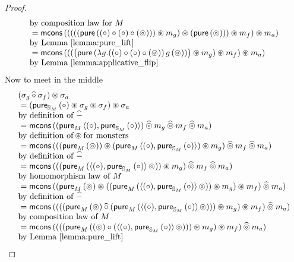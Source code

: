 \begin{lemma}
\begin{proof}
$$\begin{array}{ll}
 \mbox{by composition law for }M \\
{}= \mcons\,( (  ( (  (\apure\, ((\comp) \comp (\comp) \comp (\pappl))) \appl m_g  ) \appl (\apure\, (\pappl)) ) \appl m_f  ) \appl m_a)\\
 \mbox{by Lemma \ref{lemma:pure_lift}}\\
{}= \mcons\,( (  (  \big(\apure\, (\lambda g . ((\comp) \comp (\comp) \comp (\pappl))\, g\, (\pappl) ) \big) \appl m_g   ) \appl m_f  ) \appl m_a)\\
 \mbox{by Lemma \ref{lemma:applicative_flip}}\\
\end{array}
$$
Now to meet in the middle
$$
\begin{array}{ll}
(\sigma_g \alift{\comp} \sigma_f) \appl \sigma_a \\
{}= (\apure_{\stream{M}}\,(\comp) \appl \sigma_g \appl \sigma_f) \appl \sigma_a \\
\mbox{by definition of }\alift{-}\\
{}= \mcons\, ((\apure_M\,\pair{(\comp)}{\apure_{\stream{M}}\,(\comp)}) \alift{\pappl} m_g \alift{\pappl} m_f \alift{\pappl} m_a)\\
\mbox{by definition of}\appl\mbox{for monsters}\\
{}= \mcons\, (((\apure_M\,(\pappl)) \appl (\apure_M\,\pair{(\comp)}{\apure_{\stream{M}}\,(\comp)}) \appl m_g) \alift{\pappl} m_f \alift{\pappl} m_a)\\
\mbox{by definition of }\alift{-}\\
{}= \mcons\, (((\apure_M\,(\pair{(\comp)}{\apure_{\stream{M}}\,(\comp)}\, \pappl)) \appl m_g) \alift{\pappl} m_f \alift{\pappl} m_a)\\
 \mbox{by homomorphism law of }M\\
{}= \mcons\, ((\apure_M\,(\pappl) \appl ((\apure_M\,(\pair{(\comp)}{\apure_{\stream{M}}\,(\comp)}\, \pappl)) \appl m_g) \appl m_f) \alift{\pappl} m_a)\\
\mbox{by definition of }\alift{-}\\
{}= \mcons\, ((((\apure_M\,(\pappl) \alift{\comp} (\apure_M\,(\pair{(\comp)}{\apure_{\stream{M}}\,(\comp)}\, \pappl))) \appl m_g) \appl m_f) \alift{\pappl} m_a)\\
\mbox{by composition law of }M\\
{}= \mcons\, ((((\apure_M\,((\pappl) \comp (\pair{(\comp)}{\apure_{\stream{M}}\,(\comp)}\, \pappl))) \appl m_g) \appl m_f) \alift{\pappl} m_a)\\
\mbox{by Lemma \ref{lemma:pure_lift}}\\

\end{array}$$
\end{proof}
\end{lemma}

